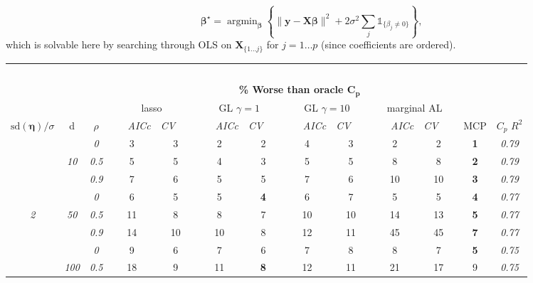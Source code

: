 \documentclass[12pt]{article}
\newcommand{\bs}[1]{\boldsymbol{#1}}
\newcommand{\mr}[1]{\mathrm{#1}}
\newcommand{\bm}[1]{\mathbf{#1}}
\newcommand{\ds}[1]{\mathds{#1}}
\DeclareMathOperator*{\argmin}{argmin}
\begin{document}
\vspace{-.75cm}
\begin{equation}\label{l0oracle}
\bs{\beta}^{\star} = \argmin_{\bs{\beta}} \left\{ \|\bm{y}-\bm{X}\bs{\beta}\|^2 + 2\sigma^2\sum_j
\ds{1}_{\{\beta_j\neq0\}}\right\},
\end{equation} which is solvable here by searching through
OLS on $\bm{X}_{\{1\ldots j\}}$ for $j=1\ldots p$ (since coefficients are ordered).

\begin{table}
\vspace{-.2cm}
\footnotesize
\begin{center}
\begin{tabular}{ccc|cc|cc|cc|cc|c|c}
\hline &&&\multicolumn{9}{|c|}{~}\\[-1ex]
\multicolumn{3}{c}{~}&\multicolumn{9}{|c|}{\bf \% Worse than oracle $\boldsymbol{C_p}$  } &   \\[1ex]
& &
& \multicolumn{2}{c}{lasso} 
& \multicolumn{2}{c}{GL $\gamma=1$} 
& \multicolumn{2}{c}{GL $\gamma=10$} 
& \multicolumn{2}{c}{marginal AL} 
& \multicolumn{1}{c|}{~} & \\[-0.5ex]
$\mr{sd}(\bs{\eta})/\sigma$ & {\sf d} & $\rho$ 
& ~~~\scriptsize\it AICc & \multicolumn{1}{c}{\scriptsize\it CV~~~}
& ~~~\scriptsize\it AICc & \multicolumn{1}{c}{\scriptsize\it CV~~~}
& ~~~\scriptsize\it AICc & \multicolumn{1}{c}{\scriptsize\it CV~~~}
& ~~~\scriptsize\it AICc & \multicolumn{1}{c}{\scriptsize\it CV~~~} 
& \multicolumn{1}{c|}{ MCP} & $C_p$ $R^2$ \\[.5ex]
\hline\rule{0pt}{3ex}
& & \it  0  & 3 & 3 & 2 & 2 & 4 & 3 & 2 & 2 & {\bf 1} & \it  0.79 \\
 & \it  10  & \it  0.5  & 5 & 5 & 4 & 3 & 5 & 5 & 8 & 8 & {\bf 2} & \it  0.79 \\
& & \it  0.9  & 7 & 6 & 5 & 5 & 7 & 6 & 10 & 10 & {\bf 3} & \it  0.79 \\[1ex]
\cline{2-3}\rule{0pt}{3ex}
& & \it  0  & 6 & 5 & 5 & {\bf 4} & 6 & 7 & 5 & 5 & {\bf 4} & \it  0.77 \\
\it  2  & \it  50  & \it  0.5  & 11 & 8 & 8 & 7 & 10 & 10 & 14 & 13 & {\bf 5} & \it  0.77 \\
& & \it  0.9  & 14 & 10 & 10 & 8 & 12 & 11 & 45 & 45 & {\bf 7} & \it  0.77 \\[1ex]
\cline{2-3}\rule{0pt}{3ex}
& & \it  0  & 9 & 6 & 7 & 6 & 7 & 8 & 8 & 7 & {\bf 5} & \it  0.75 \\
 & \it  100  & \it  0.5  & 18 & 9 & 11 & {\bf 8} & 12 & 11 & 21 & 17 & 9 & \it  0.75 \\

\end{tabular}
\end{center}
\end{table}
\end{document}
